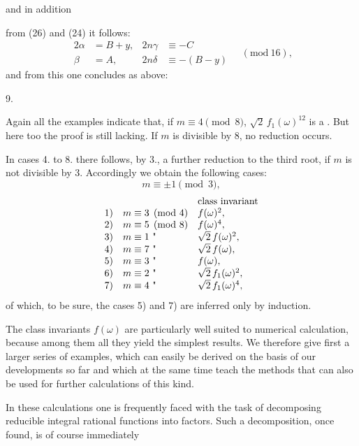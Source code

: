 
and in addition


from (26) and (24) it follows:
\[
\begin{aligned}
2\alpha &= B+y, & 2n\gamma &\equiv -C\\
\beta &= A, & 2n\delta &\equiv -(B-y)
\end{aligned}
\quad (\mathrm{mod}\ 16),
\]
and from this one concludes as above:

9. 

Again all the examples indicate that, if
$m \equiv 4 \pmod{8}$, $\sqrt{2}\,f_1(\omega)^{12}$ is a . But
here too the proof is still lacking. If $m$ is divisible by 8,
no reduction occurs.

In cases 4. to 8. there follows, by 3., a further
reduction to the third root, if $m$ is not divisible by 3.
Accordingly we obtain the following cases:
\[
m \equiv \pm 1 \pmod{3},
\]
\[
\begin{array}{lll}
 & & \text{class invariant}\\
1) & m \equiv 3 \pmod{4} & f(\omega)^2,\\
2) & m \equiv 5 \pmod{8} & f(\omega)^4,\\
3) & m \equiv 1 \ \text{\textquotedbl} & \sqrt{2}\,f(\omega)^2,\\
4) & m \equiv 7 \ \text{\textquotedbl} & \sqrt{2}\,f(\omega),\\
5) & m \equiv 3 \ \text{\textquotedbl} & f(\omega),\\
6) & m \equiv 2 \ \text{\textquotedbl} & \sqrt{2}\,f_1(\omega)^2,\\
7) & m \equiv 4 \ \text{\textquotedbl} & \sqrt{2}\,f_1(\omega)^4,
\end{array}
\]
of which, to be sure, the cases 5) and 7) are inferred only by
 induction.

The class invariants $f(\omega)$ are particularly well suited to
numerical calculation, because among them all they yield the
simplest results. We therefore give first a larger series
of examples, which can easily be derived on the basis of our developments so far and which at the same time
teach the methods that can also be used for further calculations of this kind.

In these calculations one is frequently faced with the task of
decomposing reducible integral rational functions into factors.
Such a decomposition, once found, is of course immediately
